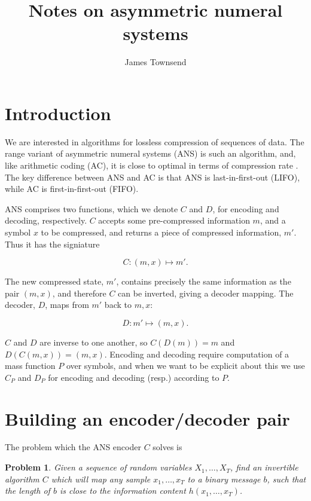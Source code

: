 \documentclass{article}
\author{James Townsend}
\title{Notes on asymmetric numeral systems}
\newtheorem{problem}{Problem}
\begin{document}
\maketitle
\section{Introduction}
We are interested in algorithms for lossless compression of sequences of data.
The range variant of asymmetric numeral systems (ANS) is such an algorithm,
and, like arithmetic coding (AC), it is close to optimal in terms of
compression rate \citep{dudaAsymmetricNumeralSystems2009}. The key difference
between ANS and AC is that ANS is last-in-first-out (LIFO), while AC is
first-in-first-out (FIFO).

ANS comprises two functions, which we denote $C$ and $D$, for encoding and
decoding, respectively. $C$ accepts some pre-compressed information $m$, and a
symbol $x$ to be compressed, and returns a piece of compressed information,
$m'$. Thus it has the signiature

\begin{equation}
  C:(m, x) \mapsto m'.
\end{equation}

The new compressed state, $m'$, contains precisely the same information as the
pair $(m, x)$, and therefore $C$ can be inverted, giving a decoder mapping. The
decoder, $D$, maps from $m'$ back to $m, x$:

\begin{equation}
  D:m' \mapsto (m, x).
\end{equation}

$C$ and $D$ are inverse to one another, so $C(D(m)) = m$ and $D(C(m,
x)) = (m, x)$. Encoding and decoding require computation of a mass function $P$
over symbols, and when we want to be explicit about this we use $C_P$ and $D_P$
for encoding and decoding (resp.) according to $P$.


\section{Building an encoder/decoder pair}
The problem which the ANS encoder $C$ solves is

\begin{problem}\label{prob:default}
        Given a sequence of random variables $X_1, \ldots, X_T$, find an
        invertible algorithm $C$ which will map any sample $x_1, \ldots, x_T$
        to a binary message $b$, such that the length of $b$ is close to the
        information content $h(x_1, \ldots, x_T)$.
\end{problem}
\end{document}
